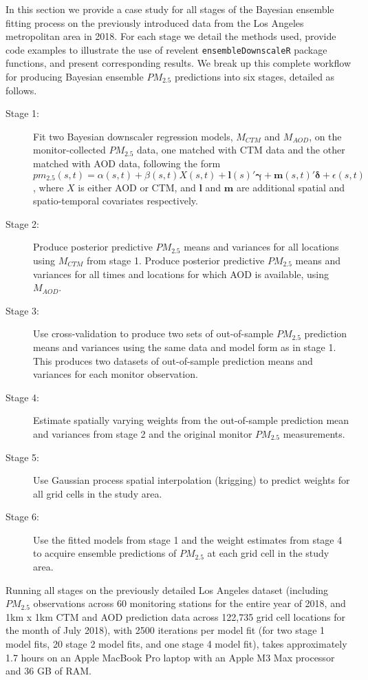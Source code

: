 \documentclass[12pt]{article}
\newcommand{\bs}{\boldsymbol}
\begin{document}
In this section we provide a case study for all stages of the Bayesian ensemble fitting process on the previously introduced data from the Los Angeles metropolitan area in 2018. 
For each stage we detail the methods used, provide code examples to illustrate the use of revelent \texttt{ensembleDownscaleR} package functions, and present corresponding results.
We break up this complete workflow for producing Bayesian ensemble $PM_{2.5}$ predictions into six stages, detailed as follows. 

\begin{description}
    \item[Stage 1:] Fit two Bayesian downscaler regression models, $M_{CTM}$ and $M_{AOD}$, on the monitor-collected $PM_{2.5}$ data, one matched with CTM data and the other matched with AOD data, following the form $pm_{2.5}(s,t) = \alpha(s, t) + \beta(s, t) X(s, t) + \mathbf{l}(s)' \bs{\gamma} +  \mathbf{m}(s, t)' \boldsymbol{\delta} + \epsilon(s, t)$, where $X$ is either AOD or CTM, and $\mathbf{l}$ and $\mathbf{m}$ are additional spatial and spatio-temporal covariates respectively. 
    \item[Stage 2:] Produce posterior predictive $PM_{2.5}$ means and variances for all locations using $M_{CTM}$ from stage 1. Produce posterior predictive $PM_{2.5}$ means and variances for all times and locations for which AOD is available, using $M_{AOD}$. 
    \item[Stage 3:] Use cross-validation to produce two sets of out-of-sample $PM_{2.5}$ prediction means and variances using the same data and model form as in stage 1. This produces two datasets of out-of-sample prediction means and variances for each monitor observation.
    \item[Stage 4:] Estimate spatially varying weights from the out-of-sample prediction mean and variances from stage 2 and the original monitor $PM_{2.5}$ measurements. 
    \item[Stage 5:] Use Gaussian process spatial interpolation (krigging) to predict weights for all grid cells in the study area. 
    \item[Stage 6:] Use the fitted models from stage 1 and the weight estimates from stage 4 to acquire ensemble predictions of $PM_{2.5}$ at each grid cell in the study area. 
\end{description}

Running all stages on the previously detailed Los Angeles dataset (including $PM_2.5$ observations across 60 monitoring stations for the entire year of 2018, and 1km x 1km CTM and AOD prediction data across 122,735 grid cell locations for the month of July 2018), with 2500 iterations per model fit (for two stage 1 model fits, 20 stage 2 model fits, and one stage 4 model fit), takes approximately 1.7 hours on an Apple MacBook Pro laptop with an Apple M3 Max processor and 36 GB of RAM.
\end{document}
